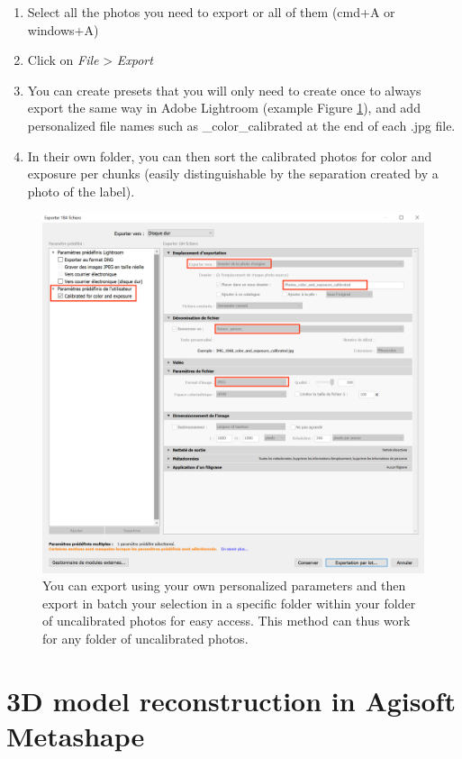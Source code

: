 \documentclass[
]{book}
\begin{document}
\begin{enumerate}
\def\labelenumi{\arabic{enumi}.}
\item
  Select all the photos you need to export or all of them (cmd+A or
  windows+A)
\item
  Click on \emph{File} \textgreater{} \emph{Export}
\item
  You can create presets that you will only need to create once to
  always export the same way in Adobe Lightroom (example Figure \ref{fig:exportparameters}), and add personalized file names
  such as \_color\_calibrated at the end of each .jpg file.
\item
  In their own folder, you can then sort the calibrated photos for
  color and exposure per chunks (easily distinguishable by the
  separation created by a photo of the label).
\end{enumerate}

\begin{figure}

{\centering \includegraphics[width=0.8\linewidth]{Figures/export_capture_1} 

}

\caption{You can export using your own personalized parameters and then export in batch your selection in a specific folder within your folder of uncalibrated photos for easy access. This method can thus work for any folder of uncalibrated photos.}\label{fig:exportparameters}
\end{figure}

\hypertarget{d-model-reconstruction-in-agisoft-metashape}{%
\chapter{3D model reconstruction in Agisoft Metashape}\label{d-model-reconstruction-in-agisoft-metashape}}
\end{document}
